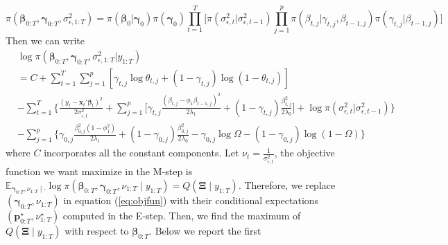 \documentclass[
  12pt,
]{book}
\theoremstyle{break}
\theoremstyle{nonumberplain}
\begin{document}
\begin{equation}
\pi(\boldsymbol{\beta}_{0:T},\boldsymbol{\gamma}_{0:T},\sigma^2_{\epsilon,1:T})=\pi(\boldsymbol{\beta}_{0}|\boldsymbol{\gamma}_{0})\pi(\boldsymbol{\gamma}_{0})\prod_{t=1}^{T}\bigg[\pi(\sigma^2_{\epsilon,t}|\sigma^2_{\epsilon,t-1})\prod_{j=1}^{p}\pi(\beta_{t,j}|\gamma_{t,j},\beta_{t-1,j})\pi(\gamma_{t,j}|\beta_{t-1,j})\bigg]
\end{equation} Then we can write \begin{equation}
   \begin{aligned}\label{eq:objfun}
 & \log \pi(\boldsymbol{\beta}_{0:T},\boldsymbol{\gamma}_{0:T},\sigma^2_{\epsilon,1:T}|y_{1:T})
 \\  & = C+\sum_{t=1}^{T}\sum_{j=1}^{p}[\gamma_{t,j}\log \theta_{t,j}+(1-\gamma_{t,j})\log(1-\theta_{t,j})] 
\\ & - \sum_{t=1}^{T}\bigg\{\frac{(y_{t}-\boldsymbol{x}_{t}'\boldsymbol{\beta}_{t})^{2}}{2\sigma^{2}_{\epsilon,t}}+\sum_{j=1}^{p}\bigg[\gamma_{t,j}\frac{(\beta_{t,j}-\phi_{1}\beta_{t-1,j})^{2}}{2\lambda_{1}}+(1-\gamma_{t,j})\frac{\beta_{t,j}^{2}}{2\lambda_{0}}\bigg]+\log\pi(\sigma^2_{\epsilon,t}|\sigma^2_{\epsilon,t-1})\bigg\} 
\\ & - \sum_{j=1}^{p}\bigg\{\gamma_{0,j}\frac{\beta_{0,j}^{2}(1-\phi_{1}^{2})}{2\lambda_{1}}+(1-\gamma_{0,j})\frac{\beta_{0,j}^{2}}{2\lambda_{0}}-\gamma_{0,j}\log\Omega-(1-\gamma_{0,j})\log(1-\Omega)\bigg\}
\end{aligned}
\end{equation} where \(C\) incorporates all the constant components. Let
\(\nu_t = \frac{1}{\sigma^{2}_{\epsilon,t}}\), the objective function we
want maximize in the M-step is
\(\mathbb E_{\boldsymbol{\gamma}_{0:T},\nu_{1:T} \mid \cdot }\log\pi(\boldsymbol{\beta}_{0:T},\boldsymbol{\gamma}_{0:T},\nu_{1:T}\mid y_{1:T})=Q(\boldsymbol{\Xi}\mid y_{1:T})\).
Therefore, we replace \((\boldsymbol{\gamma}_{0:T},\nu_{1:T})\) in
equation (\ref{eq:objfun}) with their conditional expectations
\((\boldsymbol{p}^{\star}_{0:T},\nu^{\star}_{1:T})\) computed in the
E-step. Then, we find the maximum of \(Q(\boldsymbol{\Xi}\mid y_{1:T})\)
with respect to \(\boldsymbol{\beta}_{0:T}\). Below we report the first
\end{document}
